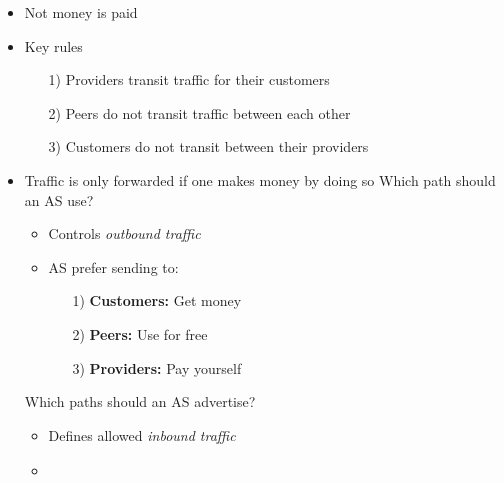\begin{itemize}
\begin{itemize}
\begin{itemize}
\begin{itemize}
\begin{itemize}
                                    \item Not money is paid
                                \end{itemize}
                        \end{itemize}
                        \begin{itemize}
                            \item Key rules
                                \begin{itemize}
                                    \item[1)] Providers transit traffic for their customers
                                    \item[2)] Peers do not transit traffic between each other
                                    \item[3)] Customers do not transit between their providers
                                \end{itemize}
                            \item Traffic is only forwarded if one makes money by doing so
                             Which path should an AS use?
                                \begin{itemize}
                                    \item Controls \textit{outbound traffic}
                                    \item AS prefer sending to:
                                        \begin{itemize}
                                            \item[1)] \textbf{Customers:} Get money
                                            \item[2)] \textbf{Peers:} Use for free
                                            \item[3)] \textbf{Providers:} Pay yourself
                                        \end{itemize}
                                \end{itemize}
                             Which paths should an AS advertise?
                                \begin{itemize}
                                    \item Defines allowed \textit{inbound traffic}
                                    \item
\begin{tabular}{| c r | c c c |}

\end{tabular}
\end{itemize}
\end{itemize}
\end{itemize}
\end{itemize}
\end{itemize}
